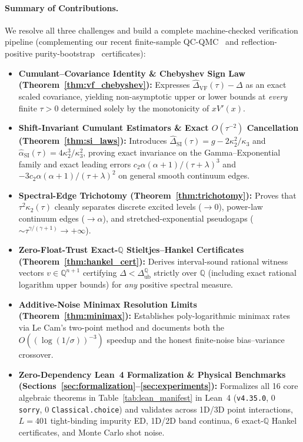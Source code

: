 \documentclass[11pt,a4paper]{article}
\theoremstyle{definition}
\newcommand{\Q}{\mathbb{Q}}
\begin{document}
\paragraph{Summary of Contributions.}
We resolve all three challenges and build a complete machine-checked verification pipeline (complementing our recent finite-sample QC-QMC~\cite{Antigravity2026QCQMC} and reflection-positive purity-bootstrap~\cite{Antigravity2026Purity} certificates):
\begin{itemize}[leftmargin=1.6em,itemsep=2pt]
  \item \textbf{Cumulant--Covariance Identity \& Chebyshev Sign Law (Theorem~\ref{thm:vf_chebyshev}):} Expresses $\widehat{\Delta}_{\mathrm{VF}}(\tau) - \Delta$ as an exact scaled covariance, yielding non-asymptotic upper or lower bounds at \emph{every} finite $\tau > 0$ determined solely by the monotonicity of $x V'(x)$.
  \item \textbf{Shift-Invariant Cumulant Estimators \& Exact $O(\tau^{-2})$ Cancellation (Theorem~\ref{thm:si_laws}):} Introduces $\widehat{\Delta}_{\mathrm{SI}}(\tau) = g - 2\kappa_2^2/\kappa_3$ and $\widehat{\alpha}_{\mathrm{SI}}(\tau) = 4\kappa_2^3/\kappa_3^2$, proving exact invariance on the Gamma--Exponential family and exact leading errors $c_2 \alpha(\alpha+1)/(\tau+\lambda)^3$ and $-3c_2\alpha(\alpha+1)/(\tau+\lambda)^2$ on general smooth continuum edges.
  \item \textbf{Spectral-Edge Trichotomy (Theorem~\ref{thm:trichotomy}):} Proves that $\tau^2\kappa_2(\tau)$ cleanly separates discrete excited levels ($\to 0$), power-law continuum edges ($\to \alpha$), and stretched-exponential pseudogaps ($\sim \tau^{\gamma/(\gamma+1)} \to +\infty$).
  \item \textbf{Zero-Float-Trust Exact-$\Q$ Stieltjes--Hankel Certificates (Theorem~\ref{thm:hankel_cert}):} Derives interval-sound rational witness vectors $v \in \Q^{n+1}$ certifying $\Delta < \Delta_{\mathrm{ub}}^{\Q}$ strictly over $\Q$ (including exact rational logarithm upper bounds) for \emph{any} positive spectral measure.
  \item \textbf{Additive-Noise Minimax Resolution Limits (Theorem~\ref{thm:minimax}):} Establishes poly-logarithmic minimax rates via Le Cam's two-point method and documents both the $O((\log(1/\sigma))^{-3})$ speedup and the honest finite-noise bias--variance crossover.
  \item \textbf{Zero-Dependency Lean~4 Formalization \& Physical Benchmarks (Sections~\ref{sec:formalization}--\ref{sec:experiments}):} Formalizes all 16 core algebraic theorems in Table~\ref{tab:lean_manifest} in Lean~4 (\texttt{v4.35.0}, 0 \texttt{sorry}, 0 \texttt{Classical.choice}) and validates across 1D/3D point interactions, $L=401$ tight-binding impurity ED, 1D/2D band continua, 6 exact-$\Q$ Hankel certificates, and Monte Carlo shot noise.
\end{itemize}
\end{document}
